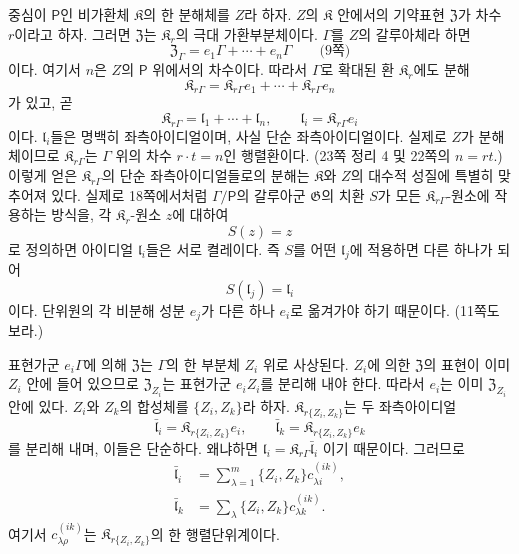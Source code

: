 중심이 \(\mathsf P\)인 비가환체 \(\mathfrak K\)의 한 분해체를 \(Z\)라 하자. \(Z\)의 \(\mathfrak K\) 안에서의 기약표현 \(\mathfrak Z\)가 차수 \(r\)이라고 하자. 그러면 \(\mathfrak Z\)는 \(\mathfrak K_r\)의 극대 가환부분체이다. \(\Gamma\)를 \(Z\)의 갈루아체라 하면
\[
        \mathfrak Z_\Gamma
        =e_1\Gamma+\cdots+e_n\Gamma
        \qquad\text{(9쪽)}
\]
이다. 여기서 \(n\)은 \(Z\)의 \(\mathsf P\) 위에서의 차수이다. 따라서 \(\Gamma\)로 확대된 환 \(\mathfrak K_r\)에도 분해
\[
        \mathfrak K_{r\Gamma}
        =\mathfrak K_{r\Gamma}e_1
         +\cdots+
         \mathfrak K_{r\Gamma}e_n
\]
가 있고, 곧
\[
        \mathfrak K_{r\Gamma}
        =\mathfrak l_1+\cdots+\mathfrak l_n,
        \qquad
        \mathfrak l_i=\mathfrak K_{r\Gamma}e_i
\]
이다. \(\mathfrak l_i\)들은 명백히 좌측아이디얼이며, 사실 단순 좌측아이디얼이다. 실제로 \(Z\)가 분해체이므로 \(\mathfrak K_{r\Gamma}\)는 \(\Gamma\) 위의 차수 \(r\cdot t=n\)인 행렬환이다. (23쪽 정리 4 및 22쪽의 \(n=rt\).) 이렇게 얻은 \(\mathfrak K_{r\Gamma}\)의 단순 좌측아이디얼들로의 분해는 \(\mathfrak K\)와 \(Z\)의 대수적 성질에 특별히 맞추어져 있다. 실제로 18쪽에서처럼 \(\Gamma/\mathsf P\)의 갈루아군 \(\mathfrak G\)의 치환 \(S\)가 모든 \(\mathfrak K_{r\Gamma}\)-원소에 작용하는 방식을, 각 \(\mathfrak K_r\)-원소 \(z\)에 대하여
\[
        S(z)=z
\]
로 정의하면 아이디얼 \(\mathfrak l_i\)들은 서로 켤레이다. 즉 \(S\)를 어떤 \(\mathfrak l_j\)에 적용하면 다른 하나가 되어
\[
        S(\mathfrak l_j)=\mathfrak l_i
\]
이다. 단위원의 각 비분해 성분 \(e_j\)가 다른 하나 \(e_i\)로 옮겨가야 하기 때문이다. (11쪽도 보라.)

표현가군 \(e_i\Gamma\)에 의해 \(\mathfrak Z\)는 \(\Gamma\)의 한 부분체 \(Z_i\) 위로 사상된다. \(Z_i\)에 의한 \(\mathfrak Z\)의 표현이 이미 \(Z_i\) 안에 들어 있으므로 \(\mathfrak Z_{Z_i}\)는 표현가군 \(e_iZ_i\)를 분리해 내야 한다. 따라서 \(e_i\)는 이미 \(\mathfrak Z_{Z_i}\) 안에 있다. \(Z_i\)와 \(Z_k\)의 합성체를 \(\{Z_i,Z_k\}\)라 하자. \(\mathfrak K_{r\{Z_i,Z_k\}}\)는 두 좌측아이디얼
\[
        \bar{\mathfrak l}_i
        =\mathfrak K_{r\{Z_i,Z_k\}}e_i,
        \qquad
        \bar{\mathfrak l}_k
        =\mathfrak K_{r\{Z_i,Z_k\}}e_k
\]
를 분리해 내며, 이들은 단순하다. 왜냐하면
\(
 \mathfrak l_i
 =\mathfrak K_{r\Gamma}\bar{\mathfrak l}_i
\)
이기 때문이다. 그러므로
\[
\begin{aligned}
\bar{\mathfrak l}_i
 &=\sum_{\lambda=1}^{m}
   \{Z_i,Z_k\}c_{\lambda i}^{(ik)},\\
\bar{\mathfrak l}_k
 &=\sum_{\lambda}
   \{Z_i,Z_k\}c_{\lambda k}^{(ik)}.
\end{aligned}
\]
여기서 \(c_{\lambda\rho}^{(ik)}\)는 \(\mathfrak K_{r\{Z_i,Z_k\}}\)의 한 행렬단위계이다.

